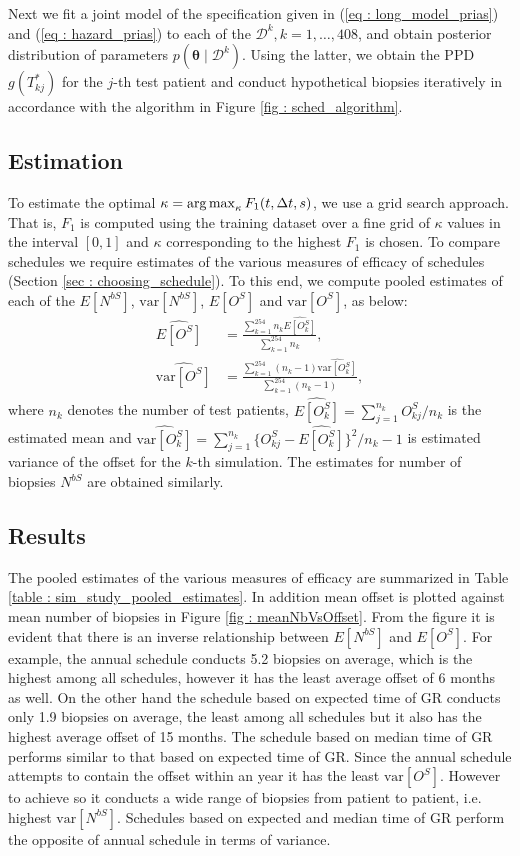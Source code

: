 Next we fit a joint model of the specification given in (\ref{eq : long_model_prias}) and (\ref{eq : hazard_prias}) to each of the $\mathcal{D}^k, k=1,
\ldots, 408$, and obtain posterior distribution of parameters $p(\boldsymbol{\theta} \mid \mathcal{D}^k)$. Using the latter, we obtain the PPD $g(T^*_{kj})$ for the $j$-th test patient and conduct hypothetical biopsies iteratively in accordance with the algorithm in Figure \ref{fig : sched_algorithm}. 

\subsection{Estimation}
To estimate the optimal $\kappa = \operatorname{arg\,max}_{\kappa} F_1(t, \Delta t, s)$, we use a grid search approach. That is, $F_1$ is computed using the training dataset over a fine grid of $\kappa$ values in the interval $[0,1]$ and $\kappa$ corresponding to the highest $F_1$ is chosen. 
To compare schedules we require estimates of the various measures of efficacy of schedules (Section \ref{sec : choosing_schedule}). To this end, we compute pooled estimates of each of the $E[N^{bS}]$, $\mbox{var}[N^{bS}]$, $E[O^S]$ and $\mbox{var}[O^S]$, as below:
\begin{align*}
\widehat{E[O^S]} &= \frac{\sum_{k=1}^{254} n_k \widehat{E[O^S_k]}}{\sum_{k=1}^{254} n_k}, \\
\widehat{\mbox{var}[O^S]} &= \frac{\sum_{k=1}^{254} (n_k - 1) \widehat{\mbox{var}[O^S_k]}}{\sum_{k=1}^{254} (n_k-1)}, 
\end{align*}
where $n_k$ denotes the number of test patients, $\widehat{E[O^S_k]} = {\sum_{j=1}^{n_k}O^S_{kj}}/{n_k}$ is the estimated mean and $\widehat{\mbox{var}[O^S_k]} = {\sum_{j=1}^{n_k}\big\{O^S_{kj} - \widehat{E[O^S_k]}\big\}^2}/{n_k-1}$ is estimated variance of the offset for the $k$-th simulation. The estimates for number of biopsies $N^{bS}$ are obtained similarly.

\subsection{Results}
The pooled estimates of the various measures of efficacy are summarized in Table \ref{table : sim_study_pooled_estimates}. In addition mean offset is plotted against mean number of biopsies in Figure \ref{fig : meanNbVsOffset}. From the figure it is evident that there is an inverse relationship between $E[N^{bS}]$ and $E[O^S]$. For example, the annual schedule conducts 5.2 biopsies on average, which is the highest among all schedules, however it has the least average offset of 6 months as well. On the other hand the schedule based on expected time of GR conducts only 1.9 biopsies on average, the least among all schedules but it also has the highest average offset of 15 months. The schedule based on median time of GR performs similar to that based on expected time of GR. Since the annual schedule attempts to contain the offset within an year it has the least $\mbox{var}[O^S]$. However to achieve so it conducts a wide range of biopsies from patient to patient, i.e. highest $\mbox{var}[N^{bS}]$. Schedules based on expected and median time of GR perform the opposite of annual schedule in terms of variance.


